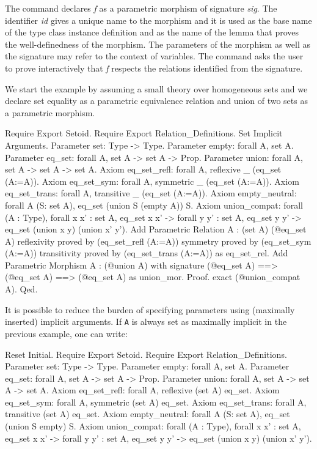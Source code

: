 The command declares \textit{f} as a parametric morphism of signature
\textit{sig}. The identifier \textit{id} gives a unique name to the morphism
and it is used as the base name of the type class instance definition 
and as the name of the lemma that proves the well-definedness of the morphism.
The parameters of the morphism as well as the signature may refer to the
context of variables.
The command asks the user to prove interactively that \textit{f} respects
the relations identified from the signature.

\begin{cscexample}
We start the example by assuming a small theory over homogeneous sets and
we declare set equality as a parametric equivalence relation and
union of two sets as a parametric morphism.
\begin{coq_example*}
Require Export Setoid.
Require Export Relation_Definitions.
Set Implicit Arguments.
Parameter set: Type -> Type.
Parameter empty: forall A, set A.
Parameter eq_set: forall A, set A -> set A -> Prop.
Parameter union: forall A, set A -> set A -> set A.
Axiom eq_set_refl: forall A, reflexive _ (eq_set (A:=A)).
Axiom eq_set_sym: forall A, symmetric _ (eq_set (A:=A)).
Axiom eq_set_trans: forall A, transitive _ (eq_set (A:=A)).
Axiom empty_neutral: forall A (S: set A), eq_set (union S (empty A)) S.
Axiom union_compat:
 forall (A : Type),
  forall x x' : set A, eq_set x x' ->
  forall y y' : set A, eq_set y y' ->
   eq_set (union x y) (union x' y').
Add Parametric Relation A : (set A) (@eq_set A)
 reflexivity proved by (eq_set_refl (A:=A))
 symmetry proved by (eq_set_sym (A:=A))
 transitivity proved by (eq_set_trans (A:=A))
 as eq_set_rel.
Add Parametric Morphism A : (@union A) with 
signature (@eq_set A) ==> (@eq_set A) ==> (@eq_set A) as union_mor.
Proof. exact (@union_compat A). Qed.
\end{coq_example*}

\end{cscexample}

It is possible to reduce the burden of specifying parameters using
(maximally inserted) implicit arguments. If \texttt{A} is always set as
maximally implicit in the previous example, one can write:

\begin{coq_eval}
Reset Initial.
Require Export Setoid.
Require Export Relation_Definitions.
Parameter set: Type -> Type.
Parameter empty: forall {A}, set A.
Parameter eq_set: forall {A}, set A -> set A -> Prop.
Parameter union: forall {A}, set A -> set A -> set A.
Axiom eq_set_refl: forall {A}, reflexive (set A) eq_set.
Axiom eq_set_sym: forall {A}, symmetric (set A) eq_set.
Axiom eq_set_trans: forall {A}, transitive (set A) eq_set.
Axiom empty_neutral: forall A (S: set A), eq_set (union S empty) S.
Axiom union_compat:
 forall (A : Type),
  forall x x' : set A, eq_set x x' ->
  forall y y' : set A, eq_set y y' ->
   eq_set (union x y) (union x' y').
\end{coq_eval}

